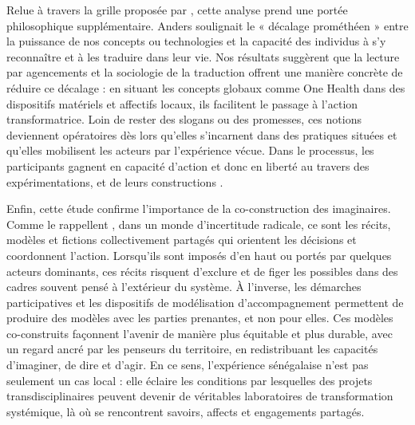 \documentclass{article}
\begin{document}
Relue à travers la grille proposée par \textcite{anders_obsolescence_1956}, cette analyse prend une portée philosophique supplémentaire. Anders soulignait le « décalage prométhéen » entre la puissance de nos concepts ou technologies et la capacité des individus à s’y reconnaître et à les traduire dans leur vie. Nos résultats suggèrent que la lecture par agencements et la sociologie de la traduction offrent une manière concrète de réduire ce décalage : en situant les concepts globaux comme One Health dans des dispositifs matériels et affectifs locaux, ils facilitent le passage à l’action transformatrice. Loin de rester des slogans ou des promesses, ces notions deviennent opératoires dès lors qu’elles s’incarnent dans des pratiques situées et qu’elles mobilisent les acteurs par l’expérience vécue. Dans le processus, les participants gagnent en capacité d'action et donc en liberté au travers des expérimentations, et de leurs constructions
\parencite{sen_development_1999}.

Enfin, cette étude confirme l’importance de la co-construction des imaginaires. Comme le rappellent \textcite{castoriadis_domaines_1999,beckert_uncertain_2018}, dans un monde d’incertitude radicale, ce sont les récits, modèles et fictions collectivement partagés qui orientent les décisions et coordonnent l’action. Lorsqu’ils sont imposés d’en haut ou portés par quelques acteurs dominants, ces récits risquent d’exclure et de figer les possibles dans des cadres souvent pensé à l'extérieur du système. À l’inverse, les démarches participatives et les dispositifs de modélisation d’accompagnement permettent de produire des modèles avec les parties prenantes, et non pour elles. Ces modèles co-construits façonnent l’avenir de manière plus équitable et plus durable, avec un regard ancré par les penseurs du territoire, en redistribuant les capacités d’imaginer, de dire et d’agir. En ce sens, l’expérience sénégalaise n’est pas seulement un cas local : elle éclaire les conditions par lesquelles des projets transdisciplinaires peuvent devenir de véritables laboratoires de transformation systémique, là où se rencontrent savoirs, affects et engagements partagés.


\printbibliography
\end{document}
